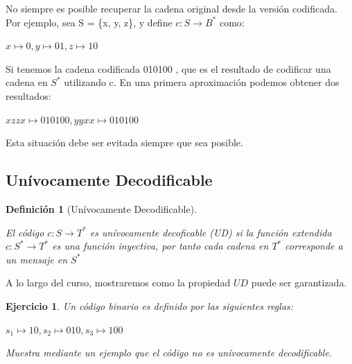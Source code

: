 \documentclass{beamer}
\newtheorem{definicion} [Definicion]{Definición}
\newtheorem{ejercicio} [Corolario]{Ejercicio}
\begin{document}

\begin{frame} 

No siempre es posible recuperar la cadena original desde la versión codificada. Por ejemplo, sea
S = \{x, y, z\}, y define  $c: S \rightarrow B^{*}$ como:

\begin{center} $x \mapsto 0,  y\mapsto 01, z \mapsto 10 $ \end{center}

Si tenemos la cadena codificada  010100 , que es el resultado de codificar una cadena en $S^{*}$ utilizando c. En una primera aproximación podemos obtener dos resultados:

\begin{center} $xzzx\mapsto 010100,  yyxx\mapsto 010100 $ \end{center}

Esta situación debe ser evitada siempre que sea posible. 



\end{frame}


\subsection{Unívocamente Decodificable}

\begin{frame} 

\begin{definicion} [Unívocamente Decodificable]\label{UD}

El código $c: S \rightarrow T^{*}$ es unívocamente decoficable  (UD) si la función extendida $c: S^{*} \rightarrow T^{*}$ es una función inyectiva, por tanto cada cadena en $T^{*}$ corresponde a un mensaje en $S^{*}$
\end{definicion}

A lo largo del curso, mostraremos como  la propiedad $UD$ puede ser garantizada.

\begin{ejercicio} 

Un código binario es definido por las siguientes reglas:

\begin{center} $s_{1}\mapsto 10, s_{2}\mapsto 010, s_{3}\mapsto 100  $ \end{center}

Muestra mediante un ejemplo que el código no es unívocamente decodificable.

\end{ejercicio}
\end{frame}
\end{document}

